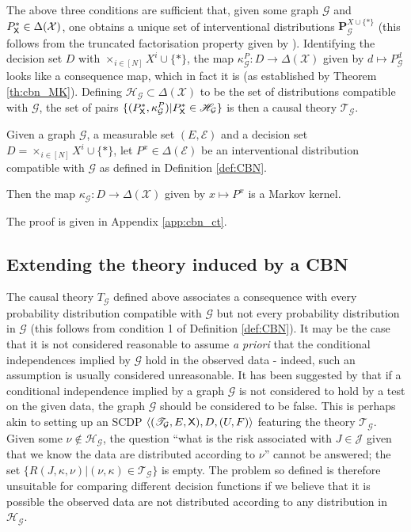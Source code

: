 The above three conditions are sufficient that, given some graph $\mathcal{G}$ and $P^*_{\mathsf{X}}\in \Delta(\mathcal{X})$, one obtains a unique set of interventional distributions $\mathbf{P}_{\mathcal{G}}^{X\cup\{*\}}$ (this follows from the truncated factorisation property given by \cite{pearl_causality:_2009}). Identifying the decision set $D$ with $\times_{i\in [N]} X^i\cup\{*\}$, the map $\kappa^P_\mathcal{G}:D\to \Delta(\mathcal{X})$ given by $d\mapsto P^d_{\mathcal{G}}$ looks like a consequence map, which in fact it is (as established by Theorem \ref{th:cbn_MK}). Defining $\mathscr{H}_{\mathcal{G}}\subset\Delta(\mathcal{X})$ to be the set of distributions compatible with $\mathcal{G}$, the set of pairs $\{(P^*_{\mathsf{X}}, \kappa^P_\mathcal{G})|P^*_{\mathsf{X}}\in \mathscr{H}_{\mathcal{G}}\}$ is then a causal theory $\mathscr{T}_\mathcal{G}$.

\begin{theorem}\label{th:cbn_MK}
Given a graph $\mathcal{G}$, a measurable set $(E,\mathcal{E})$ and a decision set $D=\times_{i\in [N]} X^i\cup\{*\}$, let $P^x\in \Delta(\mathcal{E})$ be an interventional distribution compatible with $\mathcal{G}$ as defined in Definition \ref{def:CBN}. 

Then the map $\kappa_{\mathcal{G}}:D\to \Delta(\mathcal{X})$ given by $x\mapsto P^x$ is a Markov kernel.
\end{theorem}

The proof is given in Appendix \ref{app:cbn_ct}.

\subsection{Extending the theory induced by a CBN}

The causal theory $T_{\mathcal{G}}$ defined above associates a consequence with every probability distribution compatible with $\mathcal{G}$ but not every probability distribution in $\mathcal{G}$ (this follows from condition 1 of Definition \ref{def:CBN}). It may be the case that it is not considered reasonable to assume \emph{a priori} that the conditional independences implied by $\mathcal{G}$ hold in the observed data - indeed, such an assumption is usually considered unreasonable. It has been suggested by \cite{pearl_causality:_2009} that if a conditional independence implied by a graph $\mathcal{G}$ is not considered to hold by a test on the given data, the graph $\mathcal{G}$ should be considered to be false. This is perhaps akin to setting up an SCDP $\langle (\mathscr{T}_{\mathcal{G}},E,\mathsf{X}),D,(U,F)\rangle$ featuring the theory $\mathscr{T}_{\mathcal{G}}$. Given some $\nu\not\in \mathscr{H}_{\mathcal{G}}$, the question ``what is the risk associated with $J\in\mathscr{J}$ given that we know the data are distributed according to $\nu$'' cannot be answered; the set $\{R(J,\kappa,\nu)|(\nu,\kappa)\in\mathscr{T}_{\mathcal{G}}\}$ is empty. The problem so defined is therefore unsuitable for comparing different decision functions if we believe that it is possible the observed data are not distributed according to any distribution in $\mathscr{H}_{\mathcal{G}}$.

